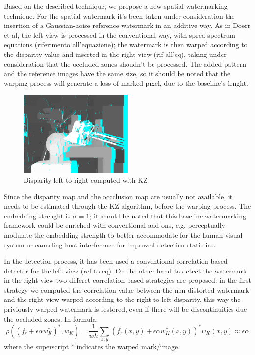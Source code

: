 Based on the described technique, we propose a new spatial watermarking technique. \newline
For the spatial watermark it's been taken under consideration the insertion of a Gaussian-noise reference watermark in an additive way.\newline
As in Doerr et al, the left view is processed in the conventional way, with spred-spectrum equations (riferimento all'equazione); the watermark is then warped according to the disparity value and inserted in the right view (rif all'eq), taking under consideration that the occluded zones shoudn't be processed.\newline
The added pattern and the reference images have the same size, so it should be noted that the warping process will generate a loss of marked pixel, due to the baseline's lenght.\newline
\begin{figure}[h!]
\centering
\includegraphics[width=0.5\textwidth]{./img/disp_left_to_right.png}
\caption{\small{Disparity left-to-right computed with KZ}}
\label{fig:kzdisplr}
\end{figure}
Since the disparity map and the occclusion map are usually not available, it needs to be estimated through the KZ algorithm, before the warping process.\newline
The embedding strenght is $\alpha=1$; it should be noted that this baseline watermarking framework could be enriched with conventional add-ons, e.g. perceptually modulate the embedding strength to better accommodate for the human visual system or canceling host interference for improved detection statistics.\newline

In the detection process, it has been used a conventional correlation-based detector for the left view (ref to eq).\newline 
On the other hand to detect the watermark in the right view two differet correlation-based strategies are proposed:
in the first strategy we computed the correlation value between the non-distorted watermark and the right view warped according to the right-to-left disparity, this way the priviously warped watermark is restored, even if there will be discontinuities due the occluded zones. In formula:
$$\rho((f_{r}+\epsilon\alpha w_{K}^{*})^{*},w_{K})= \frac{1}{wh}\sum_{x,y}(f_{r}(x,y)+\epsilon\alpha w_{K}^{*}(x,y))^{*}w_{K}(x,y)\approx\epsilon\alpha $$
where the superscript * indicates the warped mark/image.\newline

